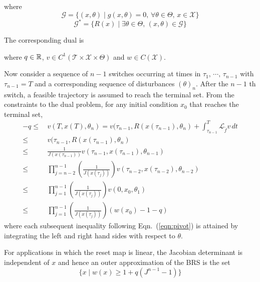 \documentclass[10pt]{scrartcl}
\theoremstyle{remark}
\providecommand{\R}{\ensuremath \mathbb{R}}
\providecommand{\ip}[1]{\ensuremath \langle #1\rangle}
\begin{document}
where $$\mathcal G=\{(x,\theta)\mid g(x,\theta)=0,\,\forall \theta\in \Theta,\,x\in \mathcal X\}$$
$$\mathcal G^*=\{R(x)\mid \exists \theta\in \Theta,\,(x,\theta)\in \mathcal G\}$$
\par
The corresponding dual is 
where $q\in \R$, $v\in C^1(\mathcal T\times \mathcal X\times \Theta)$ and $w\in C(\mathcal X)$.\par
Now consider a sequence of $n-1$ switches occurring at times in $\tau_1,\,\cdots,\,\tau_{n-1}$ with $\tau_{n-1}=T$ and a corresponding sequence of disturbances $(\theta)_n$. After the $n-1$ th switch, a feasible trajectory is assumed to reach the terminal set. From the constraints to the dual problem, for any initial condition $x_0$ that reaches the terminal set, 
\begin{align}
-q\le&\, v(T,x(T),\theta_n)=v(\tau_{n-1},R(x(\tau_{n-1}),\theta_n)+\int_{\tau_{n-1}}^T \mathcal L_{\tilde f} v \,dt\\
\le&\, v(\tau_{n-1},R(x(\tau_{n-1}),\theta_n)\label{eqn:pivot}\\
\le&\, \frac{1}{J(x(\tau_{n-1}))}{v(\tau_{n-1},x(\tau_{n-1}),\theta_{n-1})}\\
\le&\,\prod_{j=n-2}^{n-1} \left(\frac{1}{J(x(\tau_{j}))}\right){v(\tau_{n-2},x(\tau_{n-2}),\theta_{n-2})}\\
\le &\,\prod_{j=1}^{n-1} \left(\frac{1}{J(x(\tau_{j}))}\right){v(0,x_0,\theta_1)}\\
\le &\, \prod_{j=1}^{n-1} \left(\frac{1}{J(x(\tau_{j}))}\right) (w(x_0)-1-q)
\end{align}
where each subsequent inequality following Eqn.~(\ref{eqn:pivot}) is attained by integrating the left and right hand sides with respect to $\theta$.\par
For applications in which the reset map is linear, the Jacobian determinant is independent of $x$ and hence an outer approximation of the BRS is the set
$$\{x\mid w(x)\ge 1+q(J^{n-1}-1)\}$$
\end{document}
